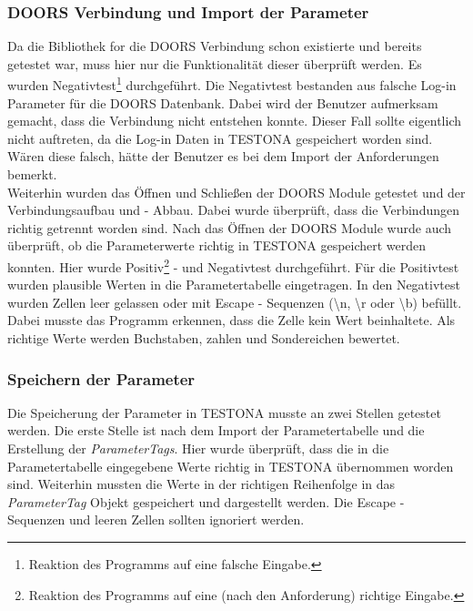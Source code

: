 \subsubsection{DOORS Verbindung und Import der Parameter}
Da die Bibliothek for die DOORS Verbindung schon existierte und bereits getestet war, muss hier nur die Funktionalität dieser überprüft werden. Es wurden Negativtest\footnote{Reaktion des Programms auf eine falsche Eingabe.} durchgeführt. Die Negativtest bestanden aus falsche Log-in Parameter für die DOORS Datenbank. Dabei wird der Benutzer aufmerksam gemacht, dass die Verbindung nicht entstehen konnte. Dieser Fall sollte eigentlich nicht auftreten, da die Log-in Daten in TESTONA gespeichert worden sind. Wären diese falsch, hätte der Benutzer es bei dem Import der Anforderungen bemerkt.\\


Weiterhin wurden das Öffnen und Schließen der DOORS Module getestet und der Verbindungsaufbau und - Abbau. Dabei wurde überprüft, dass die Verbindungen richtig getrennt worden sind. Nach das Öffnen der DOORS Module wurde auch überprüft, ob die Parameterwerte richtig in TESTONA gespeichert werden konnten. Hier wurde Positiv\footnote{Reaktion des Programms auf eine (nach den Anforderung) richtige Eingabe.} - und Negativtest durchgeführt. Für die Positivtest wurden plausible Werten in die Parametertabelle eingetragen. In den Negativtest wurden Zellen leer gelassen oder mit Escape - Sequenzen (\textbackslash n, \textbackslash r oder \textbackslash b) befüllt. Dabei musste das Programm erkennen, dass die Zelle kein Wert beinhaltete. Als richtige Werte werden Buchstaben, zahlen und Sondereichen bewertet.\\



\subsubsection{Speichern der Parameter}
Die Speicherung der Parameter in TESTONA musste an zwei Stellen getestet werden. Die erste Stelle ist nach dem Import der Parametertabelle und die Erstellung der \textit{ParameterTags}. Hier wurde überprüft, dass die in die Parametertabelle eingegebene Werte richtig in TESTONA übernommen worden sind. Weiterhin mussten die Werte in der richtigen Reihenfolge in das \textit{ParameterTag} Objekt gespeichert und dargestellt werden. Die Escape - Sequenzen und leeren Zellen sollten ignoriert werden.\\



